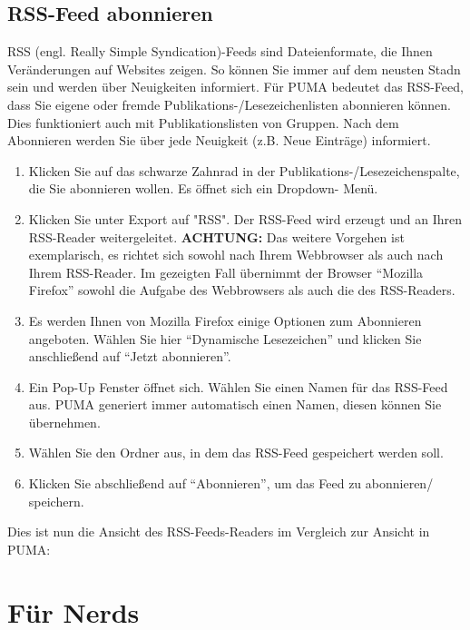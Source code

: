 \documentclass[a4paper,11pt,twoside]{scrbook}
\begin{document}
\subsection{RSS-Feed abonnieren}
RSS (engl. Really Simple Syndication)-Feeds sind Dateienformate, die Ihnen Veränderungen auf Websites zeigen. So können Sie immer auf dem neusten Stadn sein und werden über Neuigkeiten informiert. Für PUMA bedeutet das RSS-Feed, dass Sie eigene oder fremde Publikations-/Lesezeichenlisten abonnieren können. Dies funktioniert auch mit Publikationslisten von Gruppen. Nach dem Abonnieren werden Sie über jede Neuigkeit (z.B. Neue Einträge) informiert. %
\begin{enumerate}
    \item Klicken Sie auf das schwarze Zahnrad in der Publikations-/Lesezeichenspalte, die Sie abonnieren wollen. Es öffnet sich ein Dropdown- Menü.
    \item  Klicken Sie unter Export auf "RSS". Der RSS-Feed wird erzeugt und an Ihren RSS-Reader weitergeleitet. 
\newline 
\textbf{ACHTUNG:} Das weitere Vorgehen ist exemplarisch, es richtet sich sowohl nach Ihrem Webbrowser als auch nach Ihrem RSS-Reader. Im gezeigten Fall übernimmt der Browser \enquote{Mozilla Firefox} sowohl die Aufgabe des Webbrowsers als auch die des RSS-Readers.
    \item Es werden Ihnen von Mozilla Firefox einige Optionen zum Abonnieren angeboten. Wählen Sie hier \enquote{Dynamische Lesezeichen} und klicken Sie anschließend auf \enquote{Jetzt abonnieren}.
    \item Ein Pop-Up Fenster öffnet sich. Wählen Sie einen Namen für das RSS-Feed aus. PUMA generiert immer automatisch einen Namen, diesen können Sie übernehmen.
    \item Wählen Sie den Ordner aus, in dem das RSS-Feed gespeichert werden soll.
    \item Klicken Sie abschließend auf \enquote{Abonnieren}, um das Feed zu abonnieren/ speichern.
\end{enumerate}
Dies ist nun die Ansicht des RSS-Feeds-Readers im Vergleich zur Ansicht in PUMA:
\newpage
\section{Für Nerds}
\end{document}
